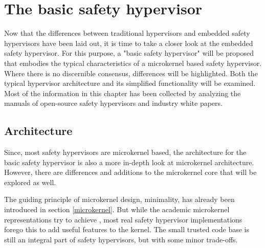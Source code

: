 
\chapter{The basic safety hypervisor} %

\label{Chapter2} %





Now that the differences between traditional hypervisors and embedded safety hypervisors have been laid out, it is time to take a closer look at the embedded safety hypervisor.
For this purpose, a "basic safety hypervisor" will be proposed that embodies the typical characteristics of a microkernel based safety hypervisor. Where there is no discernible consensus, differences will be highlighted. Both the typical hypervisor architecture and its simplified functionality will be examined.
Most of the information in this chapter has been collected by analyzing the manuals of open-source safety hypervisors and industry white papers. \cite{okl4manual} \cite{xtratum3} \cite{sel4faq} \cite{pikeosscheduling} \cite{masmano2009xtratum}

\section{Architecture}
Since, most safety hypervisors are microkernel based, the architecture for the basic safety hypervisor is also a more in-depth look at microkernel architecture. However, there are differences and additions to the microkernel core that will be explored as well.   

The guiding principle of microkernel design, minimality, has already been introduced in section \ref{microkernel}. But while the academic microkernel representations try to achieve , most real safety hypervisor implementations forego this to add useful features to the kernel. The small trusted code base is still an integral part of safety hypervisors, but with some minor trade-offs. 


